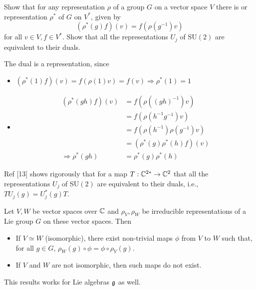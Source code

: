 \documentclass[10pt]{article}
\begin{document}
\begin{example}
	Show that for any representation $\rho$ of a group $G$ on a vector space $V$ there is  or  representation $\rho^*$ of $G$ on $V^*$, given by
	$$
	(\rho^*(g)f)(v)=f(\rho(g^{-1})v)
	$$
	for all $v \in V, f \in V^*$. Show that all the representations $U_j$ of SU$(2)$ are equivalent to their duals.
\end{example}
\sol The dual is a representation, since
\begin{itemize}
	\item $(\rho^*(1)f)(v) = f(\rho(1)v) = f(v) \Rightarrow \rho^*(1) = 1$
	\item $$\begin{aligned}
		(\rho^*(gh)f)(v) &= f(\rho((gh)^{-1})v)\\
		&= f(\rho(h^{-1}g^{-1})v)\\
		&= f(\rho(h^{-1})\rho(g^{-1})v)\\
		&= (\rho^*(g)\rho^*(h)f)(v)\\
		\Rightarrow \rho^*(gh) &= \rho^*(g)\rho^*(h)
	\end{aligned}$$
\end{itemize}
Ref [13] shows rigorously that for a map $T:\mathbb{C}^{2*} \to \mathbb{C}^2$ that all the representations $U_j$ of SU$(2)$ are equivalent to their duals, i.e., $TU_j(g) = U_j^*(g)T$.



\begin{definition}
	Let $V, W$ be vector spaces over $\mathbb{C}$ and $\rho_V, \rho_W$ be irreducible representations of a Lie group $G$ on these vector spaces. Then
	\begin{itemize}
		\item If $V \simeq W$ (isomorphic), there exist non-trivial maps $\phi$ from $V$ to $W$ such that, for all $g \in G$, $\rho_W(g) \circ \phi = \phi \circ \rho_V(g)$.
		\item If $V$ and $W$ are not isomorphic, then such maps do not exist.
	\end{itemize}
	This results works for Lie algebras $\mathfrak{g}$ as well.
\end{definition}
\end{document}
